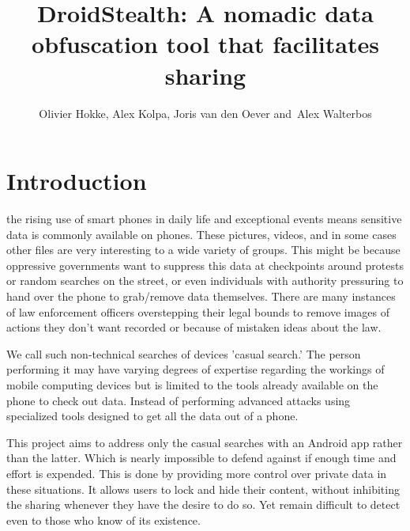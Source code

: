 \documentclass[twocolumn,english,compsoc,journal]{IEEEtran}
\begin{document}
\title{DroidStealth: A nomadic data obfuscation tool that facilitates sharing}


\author{Olivier Hokke, Alex Kolpa, Joris van den Oever and~Alex Walterbos}




\maketitle

\IEEEdisplaynontitleabstractindextext{}


\IEEEpeerreviewmaketitle{}


\section{Introduction}

 the rising use of smart phones in daily life and
exceptional events means sensitive data is commonly available on phones.
These pictures, videos, and in some cases other files are very interesting
to a wide variety of groups. This might be because oppressive governments
want to suppress this data at checkpoints around protests or random
searches on the street, or even individuals with authority pressuring
to hand over the phone to grab/remove data themselves. There are many
instances of law enforcement officers overstepping their legal bounds
to remove images of actions they don't want recorded or because of
mistaken ideas about the law. 

We call such non-technical searches of devices 'casual search.' The
person performing it may have varying degrees of expertise regarding
the workings of mobile computing devices but is limited to the tools
already available on the phone to check out data. Instead of performing
advanced attacks using specialized tools designed to get all the data
out of a phone. 

This project aims to address only the casual searches with an Android
app rather than the latter. Which is nearly impossible to defend against
if enough time and effort is expended. This is done by providing more
control over private data in these situations. It allows users to
lock and hide their content, without inhibiting the sharing whenever
they have the desire to do so. Yet remain difficult to detect even
to those who know of its existence.
\end{document}
